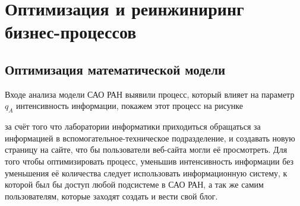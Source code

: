 \section{Оптимизация и реинжиниринг бизнес-процессов}
\subsection{Оптимизация математической модели}
Входе анализа модели САО РАН выявили процесс, который влияет на параметр $q_A$ интенсивность информации, покажем этот процесс на рисунке 



за счёт того что лаборатории информатики приходиться обращаться за информацией в вспомогательное-техническое подразделение, и создавать новую страницу на сайте, что бы пользователи веб-сайта могли её просмотреть.   Для того чтобы оптимизировать процесс, уменьшив интенсивность информации без уменьшения её количества следует использовать информационную систему, к которой был бы доступ любой подсистеме в САО РАН, а так же самим пользователям, которые заходят создать и вести свой блог.
\pagebreak